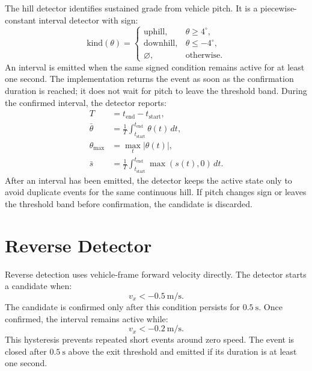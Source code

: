 \documentclass[11pt]{article}
\newcommand{\abs}[1]{\left|#1\right|}
\begin{document}
The hill detector identifies sustained grade from vehicle pitch. It is a
piecewise-constant interval detector with sign:
\begin{equation}
  \mathrm{kind}(\theta)=
  \begin{cases}
    \mathrm{uphill}, & \theta \ge 4^\circ,\\
    \mathrm{downhill}, & \theta \le -4^\circ,\\
    \varnothing, & \text{otherwise.}
  \end{cases}
\end{equation}
An interval is emitted when the same signed condition remains active for at
least one second. The implementation returns the event as soon as the
confirmation duration is reached; it does not wait for pitch to leave the
threshold band. During the confirmed interval, the detector reports:
\begin{align}
  T &= t_{\mathrm{end}}-t_{\mathrm{start}},\\
  \bar{\theta} &= \frac{1}{T}\int_{t_{\mathrm{start}}}^{t_{\mathrm{end}}}\theta(t)\,dt,\\
  \theta_{\max} &= \max_t \abs{\theta(t)},\\
  \bar{s} &= \frac{1}{T}\int_{t_{\mathrm{start}}}^{t_{\mathrm{end}}} \max(s(t),0)\,dt.
\end{align}
After an interval has been emitted, the detector keeps the active state only to
avoid duplicate events for the same continuous hill. If pitch changes sign or
leaves the threshold band before confirmation, the candidate is discarded.

\section{Reverse Detector}

Reverse detection uses vehicle-frame forward velocity directly. The detector
starts a candidate when:
\begin{equation}
  v_x < -0.5~\mathrm{m/s}.
\end{equation}
The candidate is confirmed only after this condition persists for
\(0.5~\mathrm{s}\). Once confirmed, the interval remains active while:
\begin{equation}
  v_x < -0.2~\mathrm{m/s}.
\end{equation}
This hysteresis prevents repeated short events around zero speed. The event is
closed after \(0.5~\mathrm{s}\) above the exit threshold and emitted if its
duration is at least one second.
\end{document}
